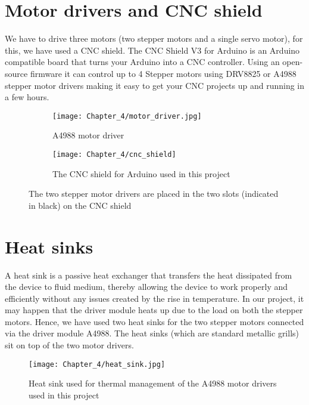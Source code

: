 \section{Motor drivers and CNC shield}

We have to drive three motors (two stepper motors and a single servo motor), for this, we have used a CNC shield. The CNC Shield V3 for Arduino is an Arduino compatible board that turns your Arduino into a CNC controller. Using an open-source firmware it can control up to 4 Stepper motors using DRV8825 or A4988 stepper motor drivers making it easy to get your CNC projects up and running in a few hours.

\begin{figure}[h]

 \begin{subfigure}{0.5\textwidth}
  \texttt{[image: Chapter\_4/motor\_driver.jpg]}
  \caption{A4988 motor driver}
  \label{fig:motor_driver}
 \end{subfigure}
 \begin{subfigure}{0.5\textwidth}
  \hspace{8mm}
  \texttt{[image: Chapter\_4/cnc\_shield]}
  \caption{The CNC shield for Arduino used in this project}
  \label{fig:shield}
 \end{subfigure}

 \caption{The two stepper motor drivers are placed in the two slots (indicated in black) on the CNC shield}
 \label{fig:driver_and_shield}
\end{figure}


\section{Heat sinks}

A heat sink is a passive heat exchanger that transfers the heat dissipated from the device to fluid medium, thereby allowing the device to work properly and efficiently without any issues created by the rise in temperature. In our project, it may happen that the driver module heats up due to the load on both the stepper motors. Hence, we have used two heat sinks for the two stepper motors connected via the driver module A4988. The heat sinks (which are standard metallic grills) sit on top of the two motor drivers.

\begin{figure}[h]
 \centering
 \texttt{[image: Chapter\_4/heat\_sink.jpg]}
 \caption{Heat sink used for thermal management of the A4988 motor drivers used in this project}
 \label{fig:sink}
\end{figure}



